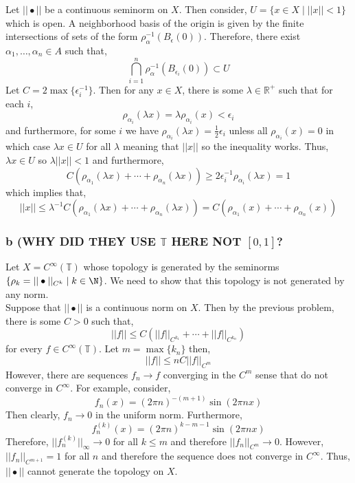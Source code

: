 \documentclass[12pt]{article}
\newcommand{\R}{\mathbb{R}}
\renewcommand{\T}{\mathbb{T}}
\begin{document}
Let $|| \bullet ||$ be a continuous seminorm on $X$. Then consider, $U = \{ x \in X \mid || x || < 1 \}$ which is open. A neighborhood basis of the origin is given by the finite intersections of sets of the form $\rho_\alpha^{-1}(B_\epsilon(0))$. Therefore, there exist $\alpha_1, \dots, \alpha_n \in A$ such that,
\[ \bigcap_{i = 1}^n \rho_\alpha^{-1}(B_{\epsilon_i}(0)) \subset U \]
Let $C = 2 \max\{ \epsilon_i^{-1} \}$. Then for any $x \in X$, there is some $\lambda \in \R^+$ such that for each $i$,
\[ \rho_{\alpha_i}(\lambda x) = \lambda \rho_{\alpha_i}(x) < \epsilon_i \]
and furthermore, for some $i$ we have $\rho_{\alpha_i}(\lambda x) = \tfrac{1}{2} \epsilon_i$ unless all $\rho_{\alpha_i}(x) = 0$ in which case $\lambda x \in U$ for all $\lambda$ meaning that $|| x || $ so the inequality works. Thus, $\lambda x \in U$ so $\lambda || x || < 1$ and furthermore,
\[ C (\rho_{\alpha_1}(\lambda x) + \cdots + \rho_{\alpha_n}(\lambda x)) \ge 2 \epsilon_i^{-1} \rho_{\alpha_i}(\lambda x) = 1 \] 
which implies that,
\[ || x || \le \lambda^{-1} C (\rho_{\alpha_1}(\lambda x) + \cdots + \rho_{\alpha_n}(\lambda x)) = C (\rho_{\alpha_1}(x) + \cdots + \rho_{\alpha_n}(x)) \]

\subsubsection{b (WHY DID THEY USE $\T$ HERE NOT $[0,1]$?}

Let $X = C^{\infty}(\T)$ whose topology is generated by the seminorms $\{ \rho_k = || \bullet ||_{C^k} \mid k \in \N \}$. We need to show that this topology is not generated by any norm.
\bigskip\\
Suppose that $|| \bullet ||$ is a continuous norm on $X$. Then by the previous problem, there is some $C > 0$ such that,
\[ || f || \le C \left( || f ||_{C^{k_1}} + \cdots + || f ||_{C^{k_n}} \right) \]
for every $f \in C^{\infty}(\T)$. Let $m = \max \{ k_n \}$ then,
\[ || f || \le n C || f ||_{C^m} \]
However, there are sequences $f_n \to f$ converging in the $C^m$ sense that do not converge in $C^\infty$. For example, consider,
\[ f_n(x) = (2 \pi n)^{-(m+1)} \sin{(2 \pi n x)} \]
Then clearly, $f_n \to 0$ in the uniform norm. Furthermore, 
\[ f_n^{(k)}(x) = (2 \pi n)^{k - m-1} \sin{(2 \pi n x)} \]
Therefore, $|| f_n^{(k)} ||_{\infty} \to 0$ for all $k \le m$ and therefore $|| f_n ||_{C^m} \to 0$. However, $|| f_n ||_{C^{m+1}} = 1$ for all $n$ and therefore the sequence does not converge in $C^\infty$. Thus, $|| \bullet ||$ cannot generate the topology on $X$.
\end{document}
